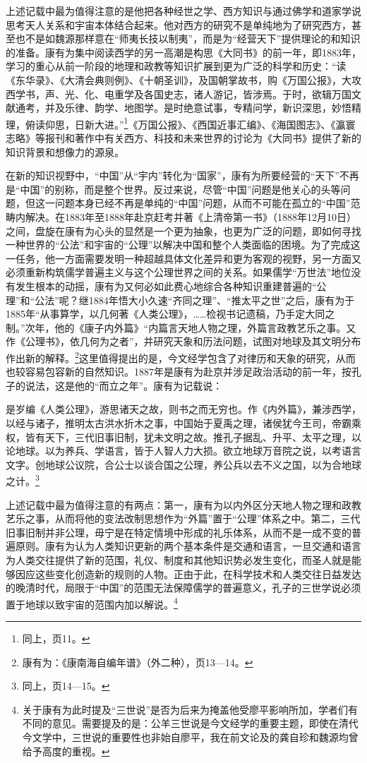 \documentclass[a4paper, 12pt, openright]{ctexbook}
\renewenvironment{quote}
  {\list{}{\rightmargin2\ccwd \leftmargin2\ccwd \itemindent=2\ccwd \listparindent=2\ccwd}%
   \item\relax\small\kaishu\color{black}}
  {\endlist}
\begin{document}
上述记载中最为值得注意的是他把各种经世之学、西方知识与通过佛学和道家学说思考天人关系和宇宙本体结合起来。他对西方的研究不是单纯地为了研究西方，甚至也不是如魏源那样意在“师夷长技以制夷”，而是为“经营天下”提供理论的和知识的准备。康有为集中阅读西学的另一高潮是构思《大同书》的前一年，即1883年，学习的重心从前一阶段的地理和政教等知识扩展到更为广泛的科学和历史：“读《东华录》、《大清会典则例》、《十朝圣训》，及国朝掌故书，购《万国公报》，大攻西学书，声、光、化、电重学及各国史志，诸人游记，皆涉焉。于时，欲辑万国文献通考，并及乐律、韵学、地图学。是时绝意试事，专精问学，新识深思，妙悟精理，俯读仰思，日新大进。”\footnote{同上，页11。}《万国公报》、《西国近事汇编》、《海国图志》、《瀛寰志略》等报刊和著作中有关西方、科技和未来世界的讨论为《大同书》提供了新的知识背景和想像力的源泉。

在新的知识视野中，“中国”从“宇内”转化为“国家”，康有为所要经营的“天下”不再是“中国”的别称，而是整个世界。反过来说，尽管“中国”问题是他关心的头等问题，但这一问题本身已经不再是单纯的“中国”问题，从而不可能在孤立的“中国”范畴内解决。在1883年至1888年赴京赶考并著《上清帝第一书》（1888年12月10日）之间，盘旋在康有为心头的显然是一个更为抽象，也更为广泛的问题，即如何寻找一种世界的“公法”和宇宙的“公理”以解决中国和整个人类面临的困境。为了完成这一任务，他一方面需要发明一种超越具体文化差异和更为客观的视野，另一方面又必须重新构筑儒学普遍主义与这个公理世界之间的关系。如果儒学“万世法”地位没有发生根本的动摇，康有为又何必如此费心地综合各种知识重建普遍的“公理”和“公法”呢？继1884年悟大小久速“齐同之理”、“推太平之世”之后，康有为于1885年“从事算学，以几何著《人类公理》，……检视书记遗稿，乃手定大同之制。”次年，他的《康子内外篇》“内篇言天地人物之理，外篇言政教艺乐之事。又作《公理书》，依几何为之者”，并研究天象和历法问题，试图对地球及其文明分布作出新的解释。\footnote{康有为：《康南海自编年谱》（外二种），页13—14。}这里值得提出的是，今文经学包含了对律历和天象的研究，从而也较容易包容新的自然知识。1887年是康有为赴京并涉足政治活动的前一年，按孔子的说法，这是他的“而立之年”。康有为记载说：

\begin{quote}
是岁编《人类公理》，游思诸天之故，则书之而无穷也。作《内外篇》，兼涉西学，以经与诸子，推明太古洪水折木之事，中国始于夏禹之理，诸侯犹今王司，帝霸乘权，皆有天下，三代旧事旧制，犹未文明之故。推孔子据乱、升平、太平之理，以论地球。以为养兵、学语言，皆于人智人力大损。欲立地球万音院之说，以考语言文字。创地球公议院，合公士以谈合国之公理，养公兵以去不义之国，以为合地球之计。\footnote{同上，页14—15。}
\end{quote}

上述记载中最为值得注意的有两点：第一，康有为以内外区分天地人物之理和政教艺乐之事，从而将他的变法改制思想作为“外篇”置于“公理”体系之中。第二，三代旧事旧制并非公理，毋宁是在特定情境中形成的礼乐体系，从而不是一成不变的普遍原则。康有为认为人类知识更新的两个基本条件是交通和语言，一旦交通和语言为人类交往提供了新的范围，礼仪、制度和其他知识势必发生变化，而圣人就是能够因应这些变化创造新的规则的人物。正由于此，在科学技术和人类交往日益发达的晚清时代，局限于“中国”的范围无法保障儒学的普遍意义，孔子的三世学说必须置于地球以致宇宙的范围内加以解说。\footnote{关于康有为此时提及“三世说”是否为后来为掩盖他受廖平影响所加，学者们有不同的意见。需要提及的是：公羊三世说是今文经学的重要主题，即使在清代今文学中，三世说的重要性也非始自廖平，我在前文论及的龚自珍和魏源均曾给予高度的重视。}
\end{document}
